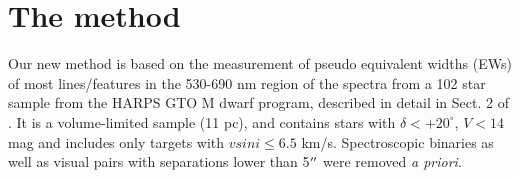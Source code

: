 \documentclass{aa}
\begin{document}








\section{The method}
\label{sec:calib}

Our new method is based on the measurement of pseudo equivalent widths (EWs) of most lines/features in the 530-690 nm region of the spectra from a 102 star sample from the HARPS GTO M dwarf program, described in detail in Sect. 2 of \citet{Bonfils-2013}. It is a volume-limited sample (11 pc), and contains stars with  $\delta< +20^{\circ}$, $V < 14$ mag and includes only targets with $vsini\le 6.5$ km/s. Spectroscopic binaries as well as visual pairs with separations lower than 5$\hbox{$^{\prime\prime}$}$ were removed \textit{a priori}.
\end{document}
